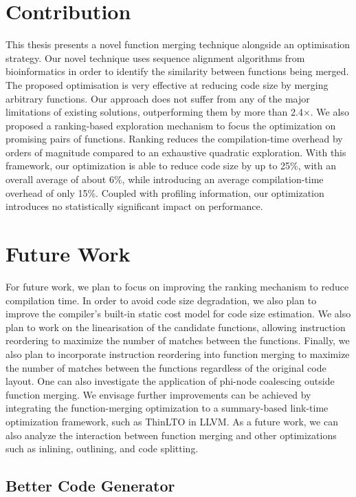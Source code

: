 \section{Contribution} \label{sec:conclusion:contribution}

This thesis presents a novel function merging technique alongside an optimisation strategy.
Our novel technique uses sequence alignment algorithms from bioinformatics in order to identify the similarity between functions being merged.
The proposed optimisation is very effective at reducing code size by merging arbitrary functions.
Our approach does not suffer from any of the major limitations of existing solutions, outperforming them by more than 2.4$\times$.
We also proposed a ranking-based exploration mechanism to focus the optimization on promising pairs of functions.
Ranking reduces the compilation-time overhead by orders of magnitude compared to an exhaustive quadratic exploration. 
With this framework, our optimization is able to reduce code size by up to 25\%, with an overall average of about 6\%, while introducing an average compilation-time overhead of only 15\%.
Coupled with profiling information, our optimization introduces no statistically significant impact on performance.

\section{Future Work} \label{sec:conclusion:futurework}

For future work, we plan to focus on improving the ranking mechanism to reduce compilation time.
In order to avoid code size degradation, we also plan to improve the compiler's built-in static cost model for code size estimation.
We also plan to work on the linearisation of the candidate functions, allowing instruction reordering to maximize the number of matches between the functions.
Finally, we also plan to incorporate instruction reordering into function merging to maximize the number of matches between the functions regardless of the original code layout.
One can also investigate the application of phi-node coalescing outside function merging.
We envisage further improvements can be achieved by integrating the function-merging optimization to a summary-based  link-time optimization framework, such as ThinLTO in LLVM.
As a future work, we can also analyze the interaction between function merging and other optimizations such as inlining, outlining, and code splitting.

\subsection{Better Code Generator}

